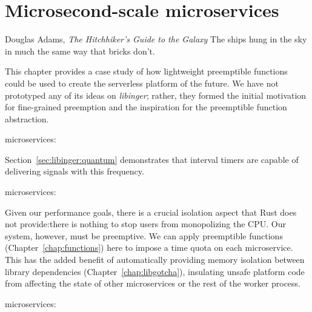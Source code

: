\chapter{Microsecond-scale microservices}
\label{chap:microservices}

\ifdefined\chapquotes
\begin{chapquote}{Douglas Adams, \textit{The Hitchhiker's Guide to the Galaxy}}
The ships hung in the sky in much the same way that bricks don't.
\end{chapquote}
\fi

This chapter provides a case study of how lightweight preemptible functions could be
used to create the serverless platform of the future.  We have not prototyped any of
its ideas on \textit{libinger}; rather, they formed the initial motivation for
fine-grained preemption and the inspiration for the preemptible function abstraction.

\begin{namespacereferences}{microservices:}







\end{namespacereferences}
\hspace{-2em}
Section~\ref{sec:libinger:quantum} demonstrates that interval timers are capable of
delivering signals with this frequency.


\begin{namespacereferences}{microservices:}

\end{namespacereferences}

Given our performance goals, there is a crucial isolation aspect that Rust does not
provide:\@ there is nothing to stop users from monopolizing the CPU.  Our system,
however, must be preemptive.  We can apply preemptible functions
(Chapter~\ref{chap:functions}) here to impose a time quota on each microservice.
This has the added benefit of automatically providing memory isolation between
library dependencies (Chapter~\ref{chap:libgotcha}), insulating unsafe platform code
from affecting the state of other microservices or the rest of the worker process.

\begin{namespacereferences}{microservices:}











\end{namespacereferences}

